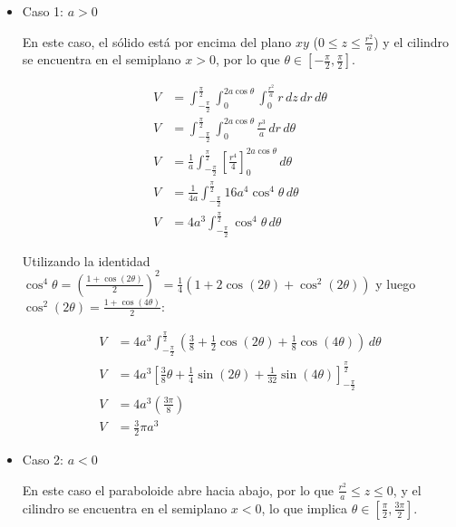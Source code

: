 \begin{itemize}

\item 

Caso 1: $a > 0$

En este caso, el sólido está por encima del plano $xy$ ($0 \le z \le \frac{r^2}{a}$) y el cilindro se encuentra en el semiplano $x > 0$, por lo que $\theta \in [-\frac{\pi}{2}, \frac{\pi}{2}]$.

\begin{align*}
V &= \int_{-\frac{\pi}{2}}^{\frac{\pi}{2}} \int_{0}^{2a \cos \theta} \int_{0}^{\frac{r^2}{a}} r \, dz \, dr \, d\theta \\
V &= \int_{-\frac{\pi}{2}}^{\frac{\pi}{2}} \int_{0}^{2a \cos \theta} \frac{r^3}{a} \, dr \, d\theta \\
V &= \frac{1}{a} \int_{-\frac{\pi}{2}}^{\frac{\pi}{2}} \left[ \frac{r^4}{4} \right]_{0}^{2a \cos \theta} \, d\theta \\
V &= \frac{1}{4a} \int_{-\frac{\pi}{2}}^{\frac{\pi}{2}} 16a^4 \cos^4 \theta \, d\theta \\
V &= 4a^3 \int_{-\frac{\pi}{2}}^{\frac{\pi}{2}} \cos^4 \theta \, d\theta
\end{align*}

Utilizando la identidad $\cos^4 \theta = (\frac{1+\cos(2\theta)}{2})^2 = \frac{1}{4}(1 + 2\cos(2\theta) + \cos^2(2\theta))$ y luego $\cos^2(2\theta) = \frac{1+\cos(4\theta)}{2}$:

\begin{align*}
V &= 4a^3 \int_{-\frac{\pi}{2}}^{\frac{\pi}{2}} \left( \frac{3}{8} + \frac{1}{2}\cos(2\theta) + \frac{1}{8}\cos(4\theta) \right) \, d\theta \\
V &= 4a^3 \left[ \frac{3}{8}\theta + \frac{1}{4}\sin(2\theta) + \frac{1}{32}\sin(4\theta) \right]_{-\frac{\pi}{2}}^{\frac{\pi}{2}} \\
V &= 4a^3 \left( \frac{3\pi}{8} \right) \\
V &= \frac{3}{2}\pi a^3
\end{align*}

\item 

Caso 2: $a < 0$

En este caso el paraboloide abre hacia abajo, por lo que $\frac{r^2}{a} \le z \le 0$, y el cilindro se encuentra en el semiplano $x < 0$, lo que implica $\theta \in [\frac{\pi}{2}, \frac{3\pi}{2}]$.


\end{itemize}
